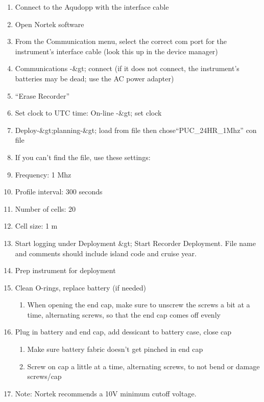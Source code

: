 \documentclass[]{book}
\providecommand{\tightlist}{%
  \setlength{\itemsep}{0pt}\setlength{\parskip}{0pt}}
\begin{document}
\begin{enumerate}
\def\labelenumi{\arabic{enumi}.}
\tightlist
\item
  Connect to the Aqudopp with the interface cable
\item
  Open Nortek software
\item
  From the Communication menu, select the correct com port for the
  instrument's interface cable (look this up in the device manager)
\item
  Communications -\&gt; connect (if it does not connect, the
  instrument's batteries may be dead; use the AC power adapter)
\item
  ``Erase Recorder''
\item
  Set clock to UTC time: On-line -\&gt; set clock
\item
  Deploy-\&gt;planning-\&gt; load from file then
  chose``PUC\_24HR\_1Mhz'' con file
\item
  If you can't find the file, use these settings:
\item
  Frequency: 1 Mhz
\item
  Profile interval: 300 seconds
\item
  Number of cells: 20
\item
  Cell size: 1 m
\item
  Start logging under Deployment \&gt; Start Recorder Deployment. File
  name and comments should include island code and cruise year.
\item
  Prep instrument for deployment
\item
  Clean O-rings, replace battery (if needed)

  \begin{enumerate}
  \def\labelenumii{\arabic{enumii}.}
  \tightlist
  \item
    When opening the end cap, make sure to unscrew the screws a bit at a
    time, alternating screws, so that the end cap comes off evenly
  \end{enumerate}
\item
  Plug in battery and end cap, add dessicant to battery case, close cap

  \begin{enumerate}
  \def\labelenumii{\arabic{enumii}.}
  \tightlist
  \item
    Make sure battery fabric doesn't get pinched in end cap
  \item
    Screw on cap a little at a time, alternating screws, to not bend or
    damage screws/cap
  \end{enumerate}
\item
  Note: Nortek recommends a 10V minimum cutoff voltage.
\end{enumerate}
\end{document}

